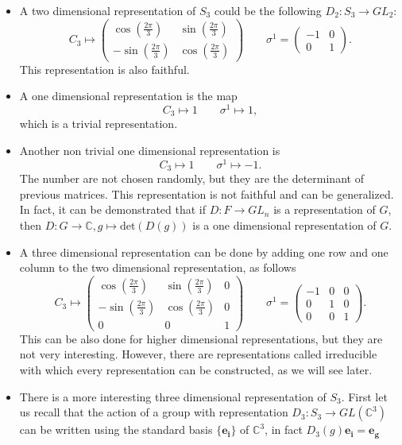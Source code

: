 \documentclass[12pt]{book}
\theoremstyle{plain}
\newcommand{\C}{\mathbb{C}}
\theoremstyle{definition}
\theoremstyle{remark}
\begin{document}
\begin{itemize}
\item A two dimensional representation of $S_3$ could be the following $D_2:S_3 \to GL_2$:
\[C_3 \mapsto \begin{pmatrix}
  \cos\left(\frac{2\pi}{3}\right) & \sin\left(\frac{2\pi}{3}\right) \\
  -\sin\left(\frac{2\pi}{3}\right) & \cos\left(\frac{2\pi}{3}\right) 
 \end{pmatrix} \qquad \sigma^1 =  \begin{pmatrix}
 -1& 0 \\
0 & 1
 \end{pmatrix}.\]
This representation is also faithful.
\item A one dimensional representation is the map
\[C_3 \mapsto 1\qquad \sigma^1 \mapsto 1,\]
which is a trivial representation.
\item Another non trivial one dimensional representation is
\[C_3\mapsto 1 \qquad \sigma^1 \mapsto -1.\]
The number are not chosen randomly, but they are the determinant of previous matrices. This representation is not faithful and can be generalized. In fact, it can be demonstrated that if $D:F\to GL_n$ is a representation of $G$, then $D:G\to \C, g\mapsto \text{det}(D(g))$ is a one dimensional representation of $G$.
\item A three dimensional representation can be done by adding one row and one column to the two dimensional representation, as follows
\[C_3 \mapsto \begin{pmatrix}
  \cos\left(\frac{2\pi}{3}\right) & \sin\left(\frac{2\pi}{3}\right) & 0\\
  -\sin\left(\frac{2\pi}{3}\right) & \cos\left(\frac{2\pi}{3}\right) & 0\\
  0 & 0 &1 
 \end{pmatrix} \qquad \sigma^1 =  \begin{pmatrix}
 -1& 0 & 0\\
0 & 1 & 0\\
0 &0 &1
 \end{pmatrix}.\]
This can be also done for higher dimensional representations, but they are not very interesting. However, there are representations called irreducible with which every representation can be constructed, as we will see later.
\item There is a more interesting three dimensional representation of $S_3$. First let us recall that the action of a group with representation $D_3:S_3\to GL(\C^3)$ can be written using the standard basis $\{\mathbf{e_i}\}$ of $\C^3$, in fact $D_3(g)\mathbf{e_i} =\mathbf{e_g}$

\end{itemize}
\end{document}
